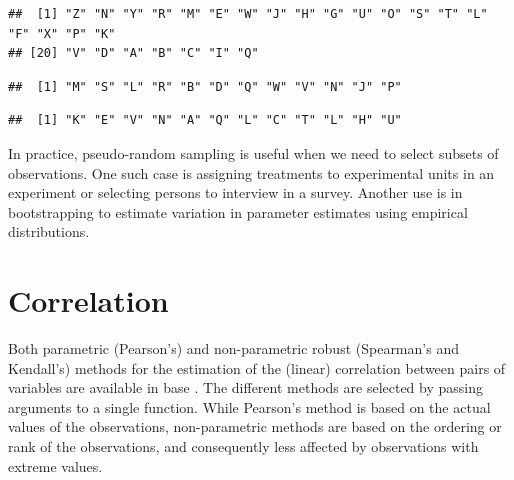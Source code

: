\documentclass[krantz2]{krantz}\usepackage{knitr}
\begin{document}
\begin{knitrout}\footnotesize
{}\color{fgcolor}\begin{kframe}
\begin{alltt}
\hlstd{(} 
\end{alltt}
\begin{verbatim}
##  [1] "Z" "N" "Y" "R" "M" "E" "W" "J" "H" "G" "U" "O" "S" "T" "L" "F" "X" "P" "K"
## [20] "V" "D" "A" "B" "C" "I" "Q"
\end{verbatim}
\begin{alltt}
\hlstd{(}   \hlstd{=} \hlstd{)}
\end{alltt}
\begin{verbatim}
##  [1] "M" "S" "L" "R" "B" "D" "Q" "W" "V" "N" "J" "P"
\end{verbatim}
\begin{alltt}
\hlstd{(}   \hlstd{=} \hlstd{,}  \hlstd{=} \hlstd{)}
\end{alltt}
\begin{verbatim}
##  [1] "K" "E" "V" "N" "A" "Q" "L" "C" "T" "L" "H" "U"
\end{verbatim}
\end{kframe}
\end{knitrout}

In practice, pseudo-random sampling is useful when we need to select subsets of observations. One such case is  assigning treatments to experimental units in an experiment or selecting persons to interview in a survey. Another use is in bootstrapping to estimate variation in parameter estimates using empirical distributions.

\section{Correlation}
Both parametric (Pearson's) and non-parametric robust (Spearman's and Kendall's) methods for the estimation of the (linear) correlation between pairs of variables are available in base \Rlang. The different methods are selected by passing arguments to a single function. While Pearson's method is based on the actual values of the observations, non-parametric methods are based on the ordering or rank of the observations, and consequently less affected by observations with extreme values.
\end{document}
